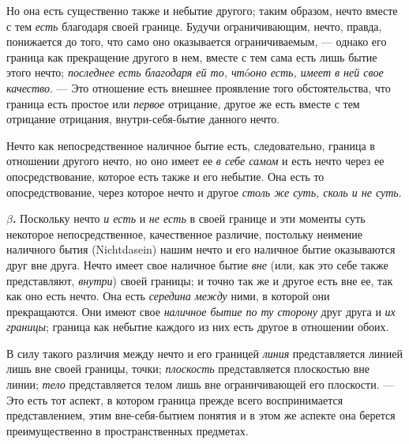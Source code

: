 Но она есть существенно также и небытие другого; таким образом, нечто вместе
с тем {\em есть} благодаря своей границе. Будучи
ограничивающим, нечто, правда, понижается до того, что само оно оказывается
ограничиваемым, — однако его граница как прекращение другого в нем, вместе
с тем сама есть лишь бытие этого нечто; {\em последнее
есть благодаря ей то, чт}ó{\em  оно есть, имеет в ней
свое качество}. — Это отношение есть внешнее проявление того
обстоятельства, что граница есть простое или
{\em первое} отрицание, другое же есть вместе с тем
отрицание отрицания, внутри-себя-бытие данного нечто.

Нечто как непосредственное наличное бытие есть, следовательно, граница в
отношении другого нечто, но оно имеет ее {\em в себе
самом} и есть нечто через ее опосредствование, которое есть также и его
небытие. Она есть то опосредствование, через которое нечто и другое
{\em столь же суть, сколь и не суть}.

\textbf{$\beta $.} Поскольку нечто {\em и есть} и
{\em не есть} в своей границе и эти моменты суть
некоторое непосредственное, качественное различие, постольку неимение
наличного бытия (Nichtdasein) нашим нечто и его наличное бытие оказываются
друг вне друга. Нечто имеет свое наличное бытие
{\em вне} (или, как это себе также представляют,
{\em внутри}) своей границы; и точно так же и другое
есть вне ее, так как оно есть нечто. Она есть
{\em середина между} ними, в которой они прекращаются.
Они имеют свое {\em наличное бытие по ту сторону} друг
друга и {\em их границы}; граница как небытие каждого
из них есть другое в отношении обоих.

В силу такого различия между нечто и его границей
{\em линия} представляется линией лишь вне своей
границы, точки; {\em плоскость} представляется
плоскостью вне линии; {\em тело} представляется телом
лишь вне ограничивающей его плоскости. — Это есть тот аспект, в котором
граница прежде всего воспринимается представлением, этим вне-себя-бытием
понятия и в этом же аспекте она берется преимущественно в пространственных
предметах.

